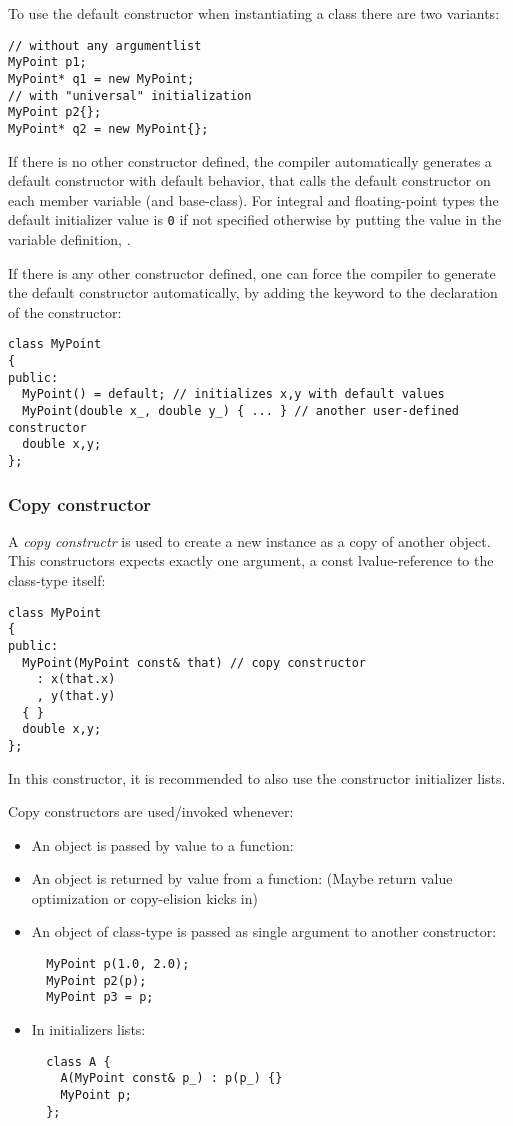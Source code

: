 To use the default constructor when instantiating a class there are two variants:
%
\begin{verbatim}
// without any argumentlist
MyPoint p1;
MyPoint* q1 = new MyPoint;
// with "universal" initialization
MyPoint p2{};
MyPoint* q2 = new MyPoint{};
\end{verbatim}

If there is no other constructor defined, the compiler automatically generates a default constructor with default behavior, \ie that calls the default constructor
on each member variable (and base-class). For integral and floating-point types the default initializer value is \texttt{0} if not specified otherwise by
putting the value in the variable definition, \ie {}.

If there is any other constructor defined, one can force the compiler to generate the default constructor automatically, by adding the keyword  to
the declaration of the constructor:
%
\begin{verbatim}
class MyPoint
{
public:
  MyPoint() = default; // initializes x,y with default values
  MyPoint(double x_, double y_) { ... } // another user-defined constructor
  double x,y;
};
\end{verbatim}


\subsubsection{Copy constructor}
A \emph{copy constructr} is used to create a new instance as a copy of another object. This constructors expects exactly one argument, a const lvalue-reference
to the class-type itself:
%
\begin{verbatim}
class MyPoint
{
public:
  MyPoint(MyPoint const& that) // copy constructor
    : x(that.x)
    , y(that.y)
  { }
  double x,y;
};
\end{verbatim}
%
In this constructor, it is recommended to also use the constructor initializer lists.

Copy constructors are used/invoked whenever:
\begin{itemize}
  \item An object is passed by value to a function:
  \item An object is returned by value from a function:
    (Maybe return value optimization or copy-elision kicks in)
  \item An object of class-type is passed as single argument to another constructor:
    \begin{verbatim}
  MyPoint p(1.0, 2.0);
  MyPoint p2(p);
  MyPoint p3 = p;
    \end{verbatim}
  \item In initializers lists:
    \begin{verbatim}
  class A {
    A(MyPoint const& p_) : p(p_) {}
    MyPoint p;
  };
    \end{verbatim}
\end{itemize}

